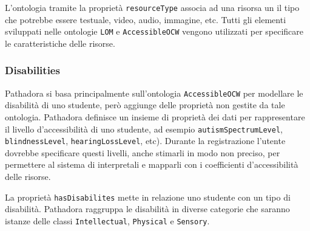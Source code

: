 L'ontologia tramite la proprietà \texttt{resourceType} associa ad una risorsa un il tipo che potrebbe essere testuale, video, audio, immagine, etc. Tutti gli elementi sviluppati nelle ontologie \texttt{LOM} e \texttt{AccessibleOCW} vengono utilizzati per specificare le caratteristiche delle risorse.

\subsubsection{Disabilities}
Pathadora si basa principalmente sull'ontologia \texttt{AccessibleOCW} per modellare le disabilità di uno studente, però aggiunge delle proprietà non gestite da tale ontologia. Pathadora definisce un insieme  di proprietà dei dati per rappresentare il livello d'accessibilità di uno studente, ad esempio \texttt{autismSpectrumLevel}, \texttt{blindnessLevel}, \texttt{hearingLossLevel}, etc). Durante la registrazione l'utente dovrebbe specificare questi livelli, anche stimarli in modo non preciso, per permettere al sistema di interpretali e mapparli con i coefficienti d'accessibilità delle risorse.

La proprietà \texttt{hasDisabilites} mette in relazione uno studente con un tipo di disabilità. Pathadora raggruppa le disabilità in diverse categorie che saranno istanze delle classi \texttt{Intellectual}, \texttt{Physical} e \texttt{Sensory}.